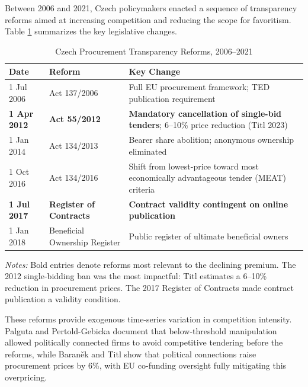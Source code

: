 \documentclass[11pt]{article}
\begin{document}
Between 2006 and 2021, Czech policymakers enacted a sequence of transparency reforms aimed at increasing competition and reducing the scope for favoritism. Table \ref{tab:reforms} summarizes the key legislative changes.

\begin{table}[htbp]\centering
\caption{Czech Procurement Transparency Reforms, 2006--2021}\label{tab:reforms}
\begin{threeparttable}
\begin{tabular}{llp{8cm}}
\toprule
Date & Reform & Key Change \\
\midrule
1 Jul 2006 & Act 137/2006 & Full EU procurement framework; TED publication requirement \\
\textbf{1 Apr 2012} & \textbf{Act 55/2012} & \textbf{Mandatory cancellation of single-bid tenders}; 6--10\% price reduction (Titl 2023) \\
1 Jan 2014 & Act 134/2013 & Bearer share abolition; anonymous ownership eliminated \\
1 Oct 2016 & Act 134/2016 & Shift from lowest-price toward most economically advantageous tender (MEAT) criteria \\
\textbf{1 Jul 2017} & \textbf{Register of Contracts} & \textbf{Contract validity contingent on online publication} \\
1 Jan 2018 & Beneficial Ownership Register & Public register of ultimate beneficial owners \\
\bottomrule
\end{tabular}
\begin{tablenotes}\footnotesize
\item \emph{Notes:} Bold entries denote reforms most relevant to the declining premium. The 2012 single-bidding ban was the most impactful: Titl \cite{Titl2023} estimates a 6--10\% reduction in procurement prices. The 2017 Register of Contracts made contract publication a validity condition.
\end{tablenotes}
\end{threeparttable}
\end{table}

These reforms provide exogenous time-series variation in competition intensity. Palguta and Pertold-Gebicka \cite{PalgutaPertold2017} document that below-threshold manipulation allowed politically connected firms to avoid competitive tendering before the reforms, while Baran\v{e}k and Titl \cite{BaranekTitl2024} show that political connections raise procurement prices by 6\%, with EU co-funding oversight fully mitigating this overpricing.
\end{document}
